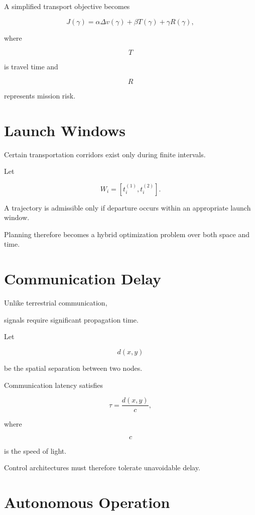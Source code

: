 \documentclass[11pt,fleqn]{book}
\numberwithin{equation}{chapter}
\theoremstyle{plain}
\theoremstyle{definition}
\theoremstyle{remark}
\begin{document}
A simplified transport objective becomes

\[
\boxed{
J(\gamma)
=
\alpha
\Delta v(\gamma)
+
\beta
T(\gamma)
+
\gamma
R(\gamma),
}
\]

where

\[
T
\]

is travel time and

\[
R
\]

represents mission risk.


\section{Launch Windows}

Certain transportation corridors exist only during finite intervals.

Let

\[
W_i
=
[t_i^{(1)},t_i^{(2)}].
\]

A trajectory is admissible only if departure occurs within an
appropriate launch window.

Planning therefore becomes a hybrid optimization problem over both space
and time.


\section{Communication Delay}

Unlike terrestrial communication,

signals require significant propagation time.

Let

\[
d(x,y)
\]

be the spatial separation between two nodes.

Communication latency satisfies

\[
\boxed{
\tau
=
\frac{d(x,y)}{c},
}
\]

where

\[
c
\]

is the speed of light.

Control architectures must therefore tolerate unavoidable delay.


\section{Autonomous Operation}
\end{document}
